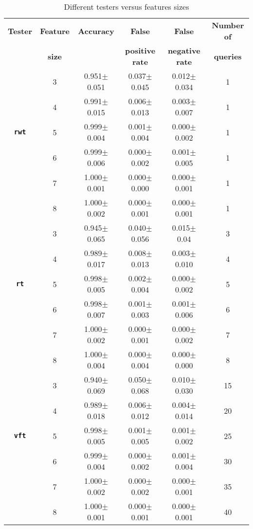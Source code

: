 \begin{table}[!ht]
    \caption{Different testers versus features sizes}

  \label{tab:diff_featureSize}
  \centering
  \begin{tabular}{cccccc}
  \\
    \toprule
    \textbf{Tester}& \textbf{Feature}& \textbf{Accuracy} & \textbf{False} & \textbf{False} & \textbf{Number of} \\
    & \textbf{size}& & \textbf{positive rate} & \textbf{negative rate} & \textbf{queries} \\
    \midrule
     & 3 & 0.951$\pm$0.051&	0.037$\pm$0.045&	0.012$\pm$0.034&	1\\
     & 4 & 0.991$\pm$0.015&	0.006$\pm$0.013&	0.003$\pm$0.007&	1\\
     \textbf{\texttt{rwt}}& 5 & 0.999$\pm$0.004&	0.001$\pm$0.004&	0.000$\pm$0.002&	1\\
     & 6 & 0.999$\pm$0.006&	0.000$\pm$0.002&	0.001$\pm$0.005&	1\\
     & 7 & 1.000$\pm$0.001&	0.000$\pm$0.000&	0.000$\pm$0.001&	1\\
     & 8 & 1.000$\pm$0.002&	0.000$\pm$0.001&	0.000$\pm$0.001&	1\\
     \midrule
     & 3 & 0.945$\pm$0.065&	0.040$\pm$0.056&	0.015$\pm$0.04&	3\\
     & 4 & 0.989$\pm$0.017&	0.008$\pm$0.013&	0.003$\pm$0.010&	4\\
     \textbf{\texttt{rt}}& 5 & 0.998$\pm$0.005&	0.002$\pm$0.004&	0.000$\pm$0.002&	5\\
     & 6 & 0.998$\pm$0.007&	0.001$\pm$0.003&	0.001$\pm$0.006&	6\\
     & 7 & 1.000$\pm$0.002&	0.000$\pm$0.001&	0.000$\pm$0.002&	7\\
     & 8 & 1.000$\pm$0.004&	0.000$\pm$0.004&	0.000$\pm$0.000&	8\\
     \midrule
     & 3 & 0.940$\pm$0.069&	0.050$\pm$0.068&	0.010$\pm$0.030&	15\\
     & 4 & 0.989$\pm$0.018&	0.006$\pm$0.012&	0.004$\pm$0.014&	20\\
     \textbf{\texttt{vft}}& 5 & 0.998$\pm$0.005&	0.001$\pm$0.005&	0.001$\pm$0.002&	25\\
     & 6 & 0.999$\pm$0.004&	0.000$\pm$0.002&	0.001$\pm$0.004&	30\\
     & 7 & 1.000$\pm$0.002&	0.000$\pm$0.002&	0.000$\pm$0.001&	35\\
     & 8 & 1.000$\pm$0.001&	0.000$\pm$0.001&	0.000$\pm$0.001&	40\\

\end{tabular}
\end{table}
